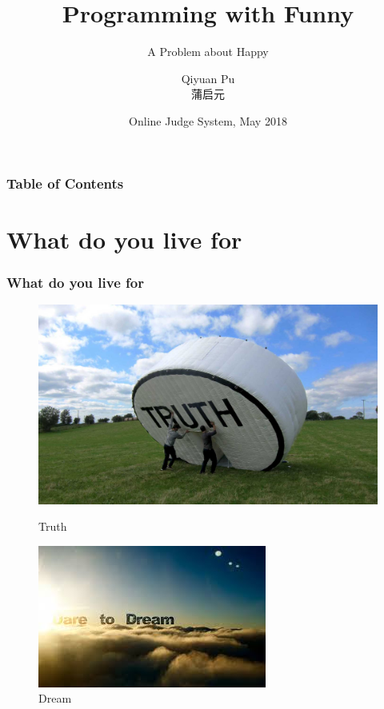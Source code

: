 \documentclass{beamer}
\title[\emph{ACM-ICPC}] %
{Programming with Funny}
\subtitle{A Problem about Happy}
\author[Qiyuan, Pu] %
{Qiyuan Pu\\ 蒲启元}
\institute[SWFU] %
{
  College of Big Data and Intelligence Engineering\\
  Southwest Forestry University
}
\date[Programming Discussion 2018] %
{Online Judge System, May 2018}
\begin{document}
 
\frame{\titlepage}


\begin{frame}
\frametitle{Table of Contents}
\tableofcontents
\end{frame}

\section{What do you live for}
\begin{frame}
  \frametitle{What do you live for}

  \begin{figure}
    \centering
    \begin{minipage}{0.45\textwidth}
        \centering
        \includegraphics[width=.7\textwidth]{./img/Truth.jpg} %
        \caption{Truth}
        \label{fig:sit-one}
    \end{minipage}\hfill
    \begin{minipage}{0.45\textwidth}
      \centering
      \includegraphics[width=.7\textwidth]{./img/dream.jpeg} 
      \caption{Dream}
      \label{fig:sit-three}
    \end{minipage}\hfill
    \begin{minipage}{0.45\textwidth}

\end{minipage}
\end{figure}
\end{frame}
\end{document}
